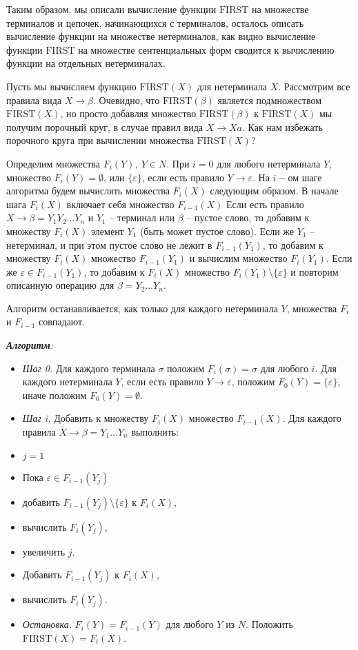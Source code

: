 \documentclass[12pt]{article}
\theoremstyle{definiton}
\theoremstyle{definition}
\theoremstyle{definition}
\theoremstyle{definition}
\let\es\emptyset
\let\eps\varepsilon
\def\first{\mathrm{ FIRST} }
\begin{document}
Таким образом, мы описали вычисление функции $\first$ на множестве терминалов и цепочек, начинающихся с терминалов, осталось описать вычисление функции на множестве нетерминалов, как видно вычисление функции $\first$ на множестве сентенциальных форм сводится к вычислению функции на отдельных нетерминалах.


Пусть мы вычисляем функцию $\first(X)$ для нетерминала $X$. Рассмотрим все правила вида $X \to \beta$. Очевидно, что $\first(\beta)$ является подмножеством $\first(X)$, но просто добавляя множество $\first(\beta)$ к $\first(X)$ мы получим порочный круг, в случае правил вида $ X \to Xa$. Как нам избежать порочного круга при вычислении множества $\first(X)$? 


Определим множества $F_i(Y),\ Y \in N$. При $i = 0$ для любого нетерминала $Y$, множество $F_i(Y) = \es$, или $ \{\eps\}$, если есть правило $Y\to \eps$. На $i-$ом шаге алгоритма будем вычислять множества $F_i(X)$ следующим образом. В начале шага $F_i(X)$ включает себя множество $F_{i-1}(X)$ Если есть правило $X \to \beta = Y_1Y_2\ldots Y_n$ и $Y_1$ -- терминал или $\beta$ -- пустое слово, то добавим к множеству $F_i(X)$ элемент $Y_1$ (быть может пустое слово). Если же $Y_1$ -- нетерминал, и при этом пустое слово не лежит в $F_{i-1}(Y_1)$, то добавим к множеству $F_i(X)$ множество $F_{i-1}(Y_1)$ и вычислим множество $F_{i}(Y_1)$. Если же $\eps \in F_{i-1}(Y_1)$, то добавим к $F_i(X)$ множество $F_i(Y_1)\setminus\{\eps\}$ и повторим описанную операцию для $\beta = Y_2\ldots Y_n$.

Алгоритм останавливается, как только для каждого нетерминала $Y$, множества $F_i$ и $F_{i-1}$ совпадают.

\begin{flushleft}
	
\emph{\textbf{Алгоритм}:} 
\end{flushleft}
\begin{itemize}
	\item[ ] \emph{Шаг 0.}  Для каждого терминала $\sigma$ положим $F_i(\sigma) = \sigma$ для любого $i$. Для каждого нетерминала $Y$, если есть правило $Y\to \eps$,  положим $F_0(Y) = \{\eps\}$, иначе положим $F_0(Y) = \es$.
	\item[ ] \emph{Шаг i.} Добавить к множеству $F_i(X)$ множество $F_{i-1}(X)$. Для каждого правила $X \to \beta = Y_1\ldots Y_n$ выполнить:
	\item[ ] \quad $j = 1$
	\item[ ] \quad Пока $\eps \in F_{i-1}(Y_j)$
	\item[ ] \qquad добавить $F_{i-1}(Y_j)\setminus\{\eps\}$ к $F_i(X)$, 
	\item[ ] \qquad вычислить $F_i(Y_j)$,
	\item[ ] \qquad увеличить $j$.
	\item[ ] \quad Добавить $F_{i-1}(Y_j)$ к $F_i(X)$,
	\item[ ] \quad вычислить $F_i(Y_j)$.	
	\item[ ] \emph{Остановка.} $F_i(Y) = F_{i-1}(Y)$ для любого $Y$ из $N$. Положить $\first(X) = F_i(X)$.
\end{itemize}
\end{document}
